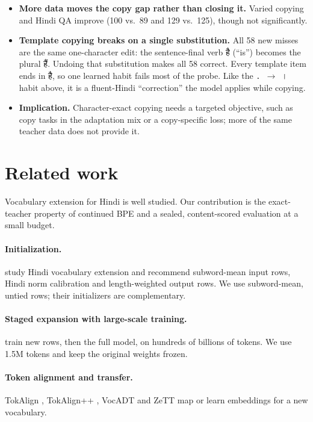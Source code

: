 \documentclass[11pt]{article}
\newcommand{\hi}[1]{{\devfont #1}}
\begin{document}
\begin{itemize}
  \item \textbf{More data moves the copy gap rather than closing it.} Varied copying and Hindi QA improve (100 vs.\ 89 and 129 vs.\ 125), though not significantly.
  \item \textbf{Template copying breaks on a single substitution.} All 58 new misses are the same one-character edit: the sentence-final verb \hi{है} (``is'') becomes the plural \hi{हैं}. Undoing that substitution makes all 58 correct. Every template item ends in \hi{है}, so one learned habit fails most of the probe. Like the \texttt{.}~$\to$~\hi{।} habit above, it is a fluent-Hindi ``correction'' the model applies while copying.
  \item \textbf{Implication.} Character-exact copying needs a targeted objective, such as copy tasks in the adaptation mix or a copy-specific loss; more of the same teacher data does not provide it.
\end{itemize}

\section{Related work}

Vocabulary extension for Hindi is well studied. Our contribution is the exact-teacher property of continued BPE and a sealed, content-scored evaluation at a small budget.

\paragraph{Initialization.} \citet{joshi2026beyond} study Hindi vocabulary extension and recommend subword-mean input rows, Hindi norm calibration and length-weighted output rows. We use subword-mean, untied rows; their initializers are complementary.

\paragraph{Staged expansion with large-scale training.} \citet{smith2026inplace} train new rows, then the full model, on hundreds of billions of tokens. We use 1.5M tokens and keep the original weights frozen.

\paragraph{Token alignment and transfer.} TokAlign \citep{li-etal-2025-tokalign}, TokAlign++ \citep{li2026tokalignpp}, VocADT \citep{han2025vocadt} and ZeTT \citep{minixhofer2024zett} map or learn embeddings for a new vocabulary.
\end{document}
